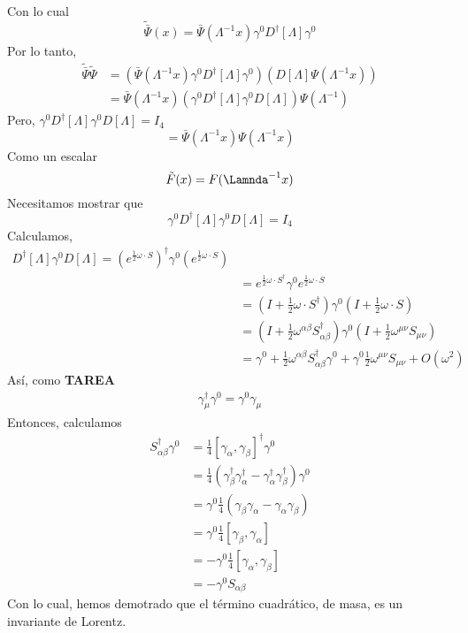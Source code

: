\documentclass[../main.tex]{subfiles}
\begin{document}
 Con lo cual
 \begin{equation}
   \tilde{\bar{\Psi}}(x) = \bar{\Psi}(\Lambda^{-1}x) \gamma^0 D^\dagger[\Lambda]\gamma^0 
  \end{equation}
  Por lo tanto,
  \begin{align*}
    \tilde{\bar{\Psi}} \tilde{\Psi} & = \left( \bar{\Psi}(\Lambda^{-1}x)\gamma^0 D^\dagger [\Lambda] \gamma^0  \right) \left( D[\Lambda] \Psi(\Lambda^{-1}x) \right) \\
    &  = \bar{\Psi}(\Lambda^{-1}x) \left( \gamma^0 D^\dagger [\Lambda] \gamma^0 D[\Lambda] \right) \Psi(\Lambda^{-1})
  \end{align*}
  Pero, $\gamma^0 D^\dagger[\Lambda] \gamma^0 D[\Lambda] = I_4$ 
  \begin{equation*}
    = \bar{\Psi}(\Lambda^{-1}x) \Psi(\Lambda^{-1}x)
  \end{equation*}
  Como un escalar
  \begin{equation*}
    \tilde{F}(x) = F (\Lamnda^{-1}x)
  \end{equation*}
  Necesitamos mostrar que
\begin{equation}
  \gamma^0 D^\dagger[\Lambda] \gamma^0 D[\Lambda] = I_4
 \end{equation}    
Calculamos,
\begin{align*}
  D^\dagger[\Lambda] \gamma^0 D[\Lambda] = \left( e^{\frac{1}{2}\omega \cdot S} \right)^\dagger \gamma^0 \left( e^{\frac{1}{2}\omega \cdot S} \right) \\
  & = e^{\frac{1}{2}\omega \cdot S^\dagger} \gamma^0 e^{\frac{1}{2}\omega \cdot S} \\
  & = \left( I + \frac{1}{2}\omega \cdot S^\dagger \right) \gamma^0 \left( I + \frac{1}{2}\omega \cdot S \right) \\
  & = \left( I + \frac{1}{2}\omega^{\alpha \beta} S_{\alpha \beta}^\dagger \right) \gamma^0 \left( I + \frac{1}{2}\omega^{\mu \nu} S_{\mu \nu} \right) \\
  & = \gamma^0 + \frac{1}{2}\omega^{\alpha \beta} S^\dagger_{\alpha \beta} \gamma^0 + \gamma^0 \frac{1}{2}\omega^{\mu \nu}S_{\mu \nu} + O(\omega^2) 
\end{align*}
Así, como \textbf{TAREA}
\begin{align*}
  \gamma^\dagger_\mu \gamma^0 = \gamma^0 \gamma_\mu 
\end{align*}
Entonces, calculamos
\begin{align*}
  S^\dagger_{\alpha \beta} \gamma^0  & = \frac{1}{4} \left[ \gamma_{\alpha}, \gamma_{\beta} \right]^\dagger \gamma^0 \\
  & = \frac{1}{4} \left( \gamma_\beta^\dagger \gamma_\alpha^\dagger - \gamma^\dagger_\alpha \gamma^\dagger_\beta \right)\gamma^0 \\
  & = \gamma^0 \frac{1}{4} \left( \gamma_\beta \gamma_\alpha - \gamma_\alpha \gamma_\beta \right) \\
  & = \gamma^0 \frac{1}{4} \left[ \gamma_\beta , \gamma_\alpha \right] \\
  & = - \gamma^0 \frac{1}{4} \left[ \gamma_\alpha , \gamma_\beta \right] \\
  & = - \gamma^0 S_{\alpha \beta}
\end{align*}
Con lo cual, hemos demotrado que el término cuadrático, de masa, es un invariante de Lorentz.
\end{document}
